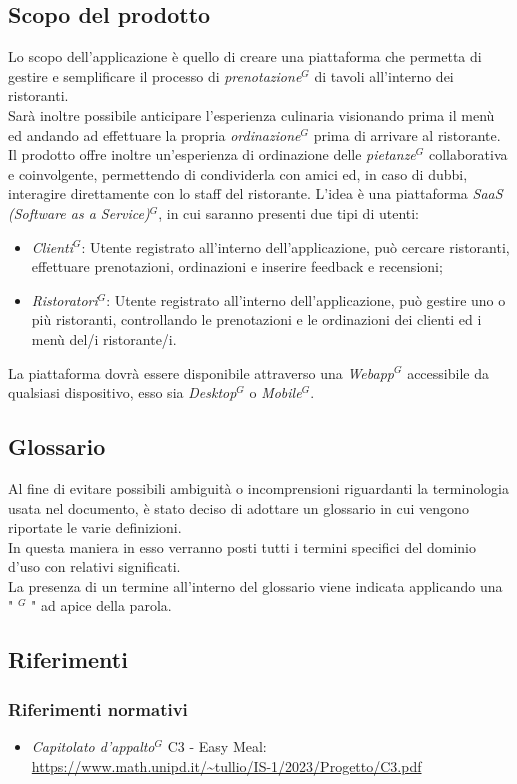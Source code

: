 \subsection{Scopo del prodotto}
Lo scopo dell'applicazione è quello di creare una piattaforma che permetta di gestire e semplificare
il processo di \emph{prenotazione}$^{G}$ di tavoli all'interno dei ristoranti. \\
Sarà inoltre possibile anticipare l'esperienza culinaria visionando prima il menù ed
andando ad effettuare la propria \emph{ordinazione}$^{G}$ prima di arrivare al ristorante. \\
Il prodotto offre inoltre un’esperienza di ordinazione delle \emph{pietanze}$^{G}$ collaborativa e coinvolgente,
permettendo di condividerla con amici ed, in caso di dubbi, interagire direttamente con lo staff del ristorante.
L’idea è una piattaforma \emph{SaaS (Software as a Service)}$^{G}$, in cui saranno presenti due tipi di utenti:
\begin{itemize}
  \item \emph{Clienti}$^{G}$: Utente registrato all’interno dell’applicazione, può cercare ristoranti, effettuare prenotazioni, ordinazioni e inserire feedback e recensioni;
  \item \emph{Ristoratori}$^{G}$: Utente registrato all’interno dell’applicazione, può gestire uno o più ristoranti, controllando le prenotazioni e le ordinazioni dei clienti ed i menù del/i ristorante/i.
\end{itemize}
La piattaforma dovrà essere disponibile attraverso una \emph{Webapp}$^{G}$ accessibile da qualsiasi dispositivo, esso sia \emph{Desktop}$^{G}$ o \emph{Mobile}$^{G}$.
\subsection{Glossario}
Al fine di evitare possibili ambiguità o incomprensioni riguardanti la terminologia usata nel documento, è stato deciso di adottare un glossario in cui vengono riportate le varie definizioni. \\
In questa maniera in esso verranno posti tutti i termini specifici del dominio d’uso con relativi significati. \\
La presenza di un termine all’interno del glossario viene indicata applicando una " $^{G}$ " ad apice della parola.
\subsection{Riferimenti}
\subsubsection{Riferimenti normativi}
    \begin{itemize}
      \item \emph{Capitolato d’appalto}$^{G}$ C3 - Easy Meal: \\
        \url{https://www.math.unipd.it/~tullio/IS-1/2023/Progetto/C3.pdf}
    \end{itemize}
